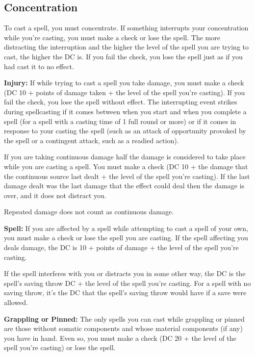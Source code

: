 \subsection{Concentration}
To cast a spell, you must concentrate. If something interrupts your concentration while you're casting, you must make a  check or lose the spell. The more distracting the interruption and the higher the level of the spell you are trying to cast, the higher the DC is. If you fail the check, you lose the spell just as if you had cast it to no effect.

\textbf{Injury:} If while trying to cast a spell you take damage, you must make a  check (DC 10 + points of damage taken + the level of the spell you're casting). If you fail the check, you lose the spell without effect. The interrupting event strikes during spellcasting if it comes between when you start and when you complete a spell (for a spell with a casting time of 1 full round or more) or if it comes in response to your casting the spell (such as an attack of opportunity provoked by the spell or a contingent attack, such as a readied action).

If you are taking continuous damage half the damage is considered to take place while you are casting a spell. You must make a  check (DC 10 + \onehalf the damage that the continuous source last dealt + the level of the spell you're casting). If the last damage dealt was the last damage that the effect could deal then the damage is over, and it does not distract you.

Repeated damage does not count as continuous damage.

\textbf{Spell:} If you are affected by a spell while attempting to cast a spell of your own, you must make a  check or lose the spell you are casting. If the spell affecting you deals damage, the DC is 10 + points of damage + the level of the spell you're casting.

If the spell interferes with you or distracts you in some other way, the DC is the spell's saving throw DC + the level of the spell you're casting. For a spell with no saving throw, it's the DC that the spell's saving throw would have if a save were allowed.

\textbf{Grappling or Pinned:} The only spells you can cast while grappling or pinned are those without somatic components and whose material components (if any) you have in hand. Even so, you must make a  check (DC 20 + the level of the spell you're casting) or lose the spell.

